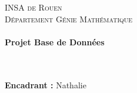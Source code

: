 \makeatletter
  \begin{titlepage}
  \centering
      {\large \textsc{INSA de Rouen}}\\
      \textsc{Département Génie Mathématique}\\
    \vspace{1cm}
      {\large\textbf{	\@date\\
       Projet Base de Données}}\\
       \vspace{7cm}
       {\LARGE \textbf{\@title}} \\
    \vspace{2em}
        {\large \@author} \\
    \vfill

    \raggedleft
    {\large \textbf{Encadrant :} Nathalie }\\
    \vspace{1cm}
  \end{titlepage}
\makeatother

\newpage
\tableofcontents
